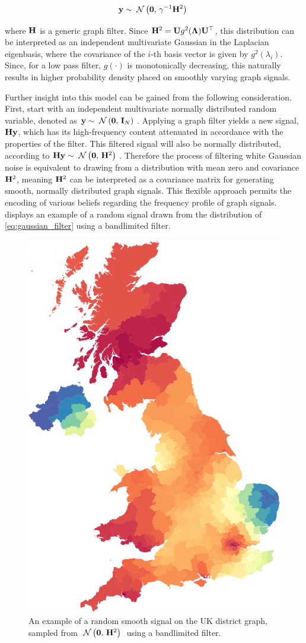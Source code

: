 \begin{equation}
    \label{eq:gaussian_filter}
    \mathbf{y} \sim \; \mathcal{N}\left(\mathbf{0}, \, \gamma^{-1} \mathbf{H}^2\right) \;
\end{equation}


where $\mathbf{H}$ is a generic graph filter. Since $\mathbf{H}^2 = \mathbf{U} g^2(\mathbf{\Lambda}) \mathbf{U}^\top$, this distribution can be interpreted as an independent multivariate Gaussian in the Laplacian eigenbasis, where the covariance of the $i$-th basis vector is given by $g^2(\lambda_i)$. Since, for a low pass filter, $g(\cdot)$ is monotonically decreasing, this naturally results in higher probability density placed on smoothly varying graph signals. 


Further insight into this model can be gained from the following consideration. First, start with an independent multivariate normally distributed random variable, denoted as $\mathbf{y} \sim \; \mathcal{N}\left(\mathbf{0}, \, \mathbf{I}_N\right) \;$. Applying a graph filter yields a new signal, $\mathbf{H} \mathbf{y}$, which has its high-frequency content attenuated in accordance with the properties of the filter. This filtered signal will also be normally distributed, according to $\mathbf{H} \mathbf{y} \sim \; \mathcal{N}\left(\mathbf{0}, \, \mathbf{H}^2\right) \;$. Therefore the process of filtering white Gaussian noise is equivalent to drawing from a distribution with mean zero and covariance $\mathbf{H}^2$, meaning $\mathbf{H}^2$ can be interpreted as a covariance matrix for generating smooth, normally distributed graph signals. This flexible approach permits the encoding of various beliefs regarding the frequency profile of graph signals.  displays an example of a random signal drawn from the distribution of \cref{eq:gaussian_filter} using a bandlimited filter.

    \begin{figure}[t]
        \vspace*{0.6cm}
	\centering
		\includegraphics[width=0.4\linewidth]{Figures/uk_smooth.pdf}
	\caption[An example of a random smooth graph signal]{An example of a random smooth signal on the UK district graph, sampled from $\; \mathcal{N}\left(\mathbf{0}, \, \mathbf{H}^2\right) \;$ using a bandlimited filter. }
	\label{fig:random_smooth_uk}
    \vspace*{0.6cm}
    \end{figure}


